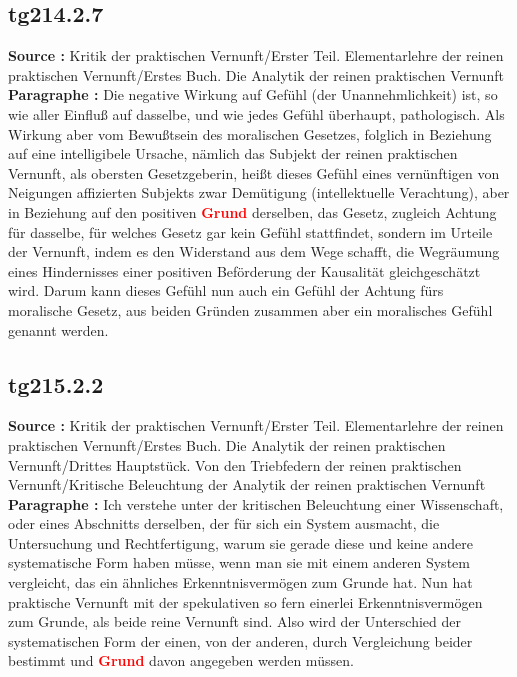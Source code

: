 \documentclass[a4paper,12pt,twoside]{book}
\newcommand{\match}[1]{\textcolor{red}{\textbf{#1}}}
\begin{document}
	\subsection*{tg214.2.7} 
	\textbf{Source : }Kritik der praktischen Vernunft/Erster Teil. Elementarlehre der reinen praktischen Vernunft/Erstes Buch. Die Analytik der reinen praktischen Vernunft\\  
	
	\noindent\textbf{Paragraphe : }Die negative Wirkung auf Gefühl (der Unannehmlichkeit) ist, so wie aller Einfluß auf dasselbe, und wie jedes Gefühl überhaupt, pathologisch. Als Wirkung aber vom Bewußtsein des moralischen Gesetzes, folglich in Beziehung auf eine intelligibele Ursache, nämlich das Subjekt der reinen praktischen Vernunft, als obersten Gesetzgeberin, heißt dieses Gefühl eines vernünftigen von Neigungen affizierten Subjekts zwar Demütigung (intellektuelle Verachtung), aber in Beziehung auf den positiven \match{Grund} derselben, das Gesetz, zugleich Achtung für dasselbe, für welches Gesetz gar kein Gefühl stattfindet, sondern im Urteile der Vernunft, indem es den Widerstand aus dem Wege schafft, die Wegräumung eines Hindernisses einer positiven Beförderung der Kausalität gleichgeschätzt wird. Darum kann dieses Gefühl nun auch ein Gefühl der Achtung fürs moralische Gesetz, aus beiden Gründen zusammen aber ein moralisches Gefühl genannt werden. 
	
	\subsection*{tg215.2.2} 
	\textbf{Source : }Kritik der praktischen Vernunft/Erster Teil. Elementarlehre der reinen praktischen Vernunft/Erstes Buch. Die Analytik der reinen praktischen Vernunft/Drittes Hauptstück. Von den Triebfedern der reinen praktischen Vernunft/Kritische Beleuchtung der Analytik der reinen praktischen Vernunft\\  
	
	\noindent\textbf{Paragraphe : }Ich verstehe unter der kritischen Beleuchtung einer Wissenschaft, oder eines Abschnitts derselben, der für sich ein System ausmacht, die Untersuchung und Rechtfertigung, warum sie gerade diese und keine andere systematische Form haben müsse, wenn man sie mit einem anderen System vergleicht, das ein ähnliches Erkenntnisvermögen zum Grunde hat. Nun hat praktische Vernunft mit der spekulativen  so fern einerlei Erkenntnisvermögen zum Grunde, als beide reine Vernunft sind. Also wird der Unterschied der systematischen Form der einen, von der anderen, durch Vergleichung beider bestimmt und \match{Grund} davon angegeben werden müssen. 
	
\end{document}
